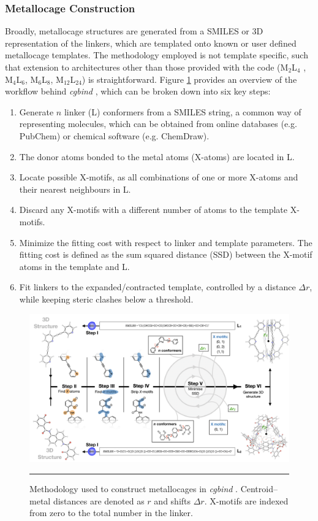 \documentclass[../../main.tex]{subfiles}
\newcommand{\cgbind}{\emph{cgbind }}
\newcommand{\MLf}{M$_2$L$_4$ }
\begin{document}
\subsubsection{Metallocage Construction}
 Broadly, metallocage structures are generated from a SMILES or 3D representation of the linkers, which are templated onto known or user defined metallocage templates. The methodology employed is not template specific, such that extension to architectures other than those provided with the code (\MLf, M$_4$L$_6$, M$_6$L$_8$, M$_{12}$L$_{24}$) is straightforward. Figure \ref{fig::cg_2} provides an overview of the workflow behind \cgbind, which can be broken down into six key steps: 

\begin{enumerate}[label=\Roman*.$\quad$]
	\item        Generate $n$ linker (L) conformers from a SMILES string, a common way of representing molecules, which can be obtained from online databases (e.g. PubChem) or chemical software (e.g. ChemDraw\texttrademark).
	\item	The donor atoms bonded to the metal atoms (X-atoms) are located in L. 
	\item		Locate possible X-motifs, as all combinations of one or more X-atoms and their nearest neighbours in L.
	\item		Discard any X-motifs with a different number of atoms to the template X-motifs.
	\item	Minimize the fitting cost with respect to linker and template parameters. The fitting cost is defined as the sum squared distance (SSD) between the X-motif atoms in the template and L.
	\item		Fit linkers to the expanded/contracted template, controlled by a distance $\Delta r$, while keeping steric clashes below a threshold. 
\end{enumerate}


\begin{figure}[h!]
	\vspace{0.4cm}
	\centering
	\includegraphics[width=\textwidth]{3/cgbind/figs/fig2}
	\vspace{0.2cm}
	\hrule
	\caption{Methodology used to construct metallocages in \cgbind. Centroid–metal distances are denoted as $r$ and shifts $\Delta r$. X-motifs are indexed from zero to the total number in the linker.}
	\label{fig::cg_2}
\end{figure}
\end{document}
